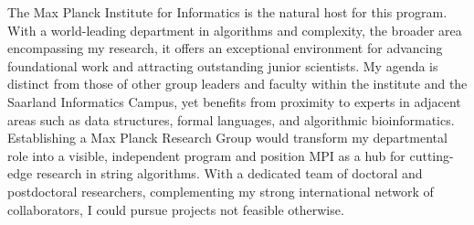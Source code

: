 \documentclass[a4paper,11pt]{article}
\begin{document}
The Max Planck Institute for Informatics is the natural host for this program. With a world-leading department in algorithms and complexity, the broader area encompassing my research, it offers an exceptional environment for advancing foundational work and attracting outstanding junior scientists. My agenda is distinct from those of other group leaders and faculty within the institute and the Saarland Informatics Campus, yet benefits from proximity to experts in adjacent areas such as data structures, formal languages, and algorithmic bioinformatics. Establishing a Max Planck Research Group would transform my departmental role into a visible, independent program and position MPI as a hub for cutting-edge research in string algorithms. With a dedicated team of doctoral and postdoctoral researchers, complementing my strong international network of collaborators, I could pursue projects not feasible otherwise.
\end{document}
